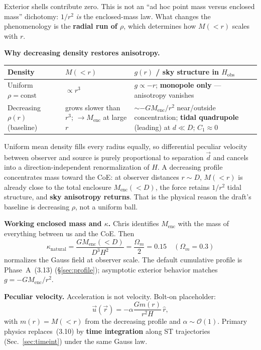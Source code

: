 \documentclass[11pt,a4paper]{article}
\begin{document}
Exterior shells contribute zero. This is not an ``ad hoc point mass versus enclosed mass'' dichotomy: \(1/r^2\) \emph{is} the enclosed-mass law. What changes the phenomenology is the \textbf{radial run of \(\rho\)}, which determines how \(M(<r)\) scales with \(r\).

\textbf{Why decreasing density restores anisotropy.}

\begin{table}[ht]
\centering
\begin{tabular}{@{}p{3.2cm}p{3.8cm}p{6.2cm}@{}}
\toprule
Density & \(M(<r)\) & \(g(r)\) / sky structure in \(H_{\mathrm{obs}}\) \\
\midrule
Uniform \(\rho=\mathrm{const}\) & \(\propto r^3\) & \(g\propto -r\); \textbf{monopole only} --- anisotropy vanishes \\
Decreasing \(\rho(r)\) (baseline) & grows slower than \(r^3\); \(\to M_{\mathrm{enc}}\) at large \(r\) & \(\sim -GM_{\mathrm{enc}}/r^2\) near/outside concentration; \textbf{tidal quadrupole} (leading) at \(d\ll D\); \(C_1\approx 0\) \\
\bottomrule
\end{tabular}
\end{table}

Uniform mean density fills every radius equally, so differential peculiar velocity between observer and source is purely proportional to separation \(\vec{d}\) and cancels into a direction-independent renormalization of \(H\). A decreasing profile concentrates mass toward the CoE: at observer distances \(r\sim D\), \(M(<r)\) is already close to the total enclosure \(M_{\mathrm{enc}}(<D)\), the force retains \(1/r^2\) tidal structure, and \textbf{sky anisotropy returns}. That is the physical reason the draft's baseline is decreasing \(\rho\), not a uniform ball.

\textbf{Working enclosed mass and \(\kappa\).} Chris identifies \(M_{\mathrm{enc}}\) with the mass of everything between us and the CoE. Then
\[
\kappa_{\mathrm{natural}}=\frac{G M_{\mathrm{enc}}(<D)}{D^3 H^2}=\frac{\Omega_m}{2}=0.15\quad(\Omega_m=0.3)
\]
normalizes the Gauss field at observer scale. The default cumulative profile is Phase~A~(3.13) (\S\ref{sec:profile}); asymptotic exterior behavior matches \(g=-GM_{\mathrm{enc}}/r^2\).

\textbf{Peculiar velocity.} Acceleration is not velocity. Bolt-on placeholder:
\begin{equation}
\vec{u}(\vec{r})=-\alpha\frac{G m(r)}{r^2 H}\,\hat{r}, \tag{3.10}\label{eq:3.10}
\end{equation}
with \(m(r)=M(<r)\) from the decreasing profile and \(\alpha\sim\mathcal{O}(1)\). Primary physics replaces~(3.10) by \textbf{time integration} along ST trajectories (Sec.~\ref{sec:timeint}) under the same Gauss law.
\end{document}
